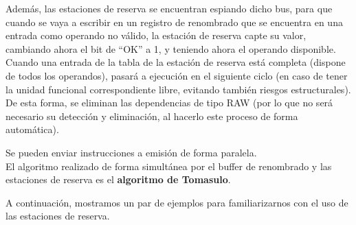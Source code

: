 Además, las estaciones de reserva se encuentran espiando dicho bus, para que cuando se vaya a escribir en un registro de renombrado que se encuentra en una entrada como operando no válido, la estación de reserva capte su valor, cambiando ahora el bit de ``OK'' a 1, y teniendo ahora el operando disponible.\\

Cuando una entrada de la tabla de la estación de reserva está completa (dispone de todos los operandos), pasará a ejecución en el siguiente ciclo (en caso de tener la unidad funcional correspondiente libre, evitando también riesgos estructurales). De esta forma, se eliminan las dependencias de tipo RAW (por lo que no será necesario su detección y eliminación, al hacerlo este proceso de forma automática).

Se pueden enviar instrucciones a emisión de forma paralela.\\

El algoritmo realizado de forma simultánea por el buffer de renombrado y las estaciones de reserva es el \textbf{algoritmo de Tomasulo}.

A continuación, mostramos un par de ejemplos para familiarizarnos con el uso de las estaciones de reserva.

